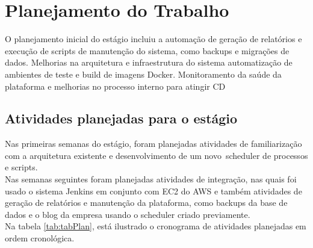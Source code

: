 \chapter{Planejamento do Trabalho}\label{chap:atividadesPlanejadas}

O planejamento inicial do estágio incluiu a automação de geração de relatórios e execução de scripts de manutenção do sistema, como backups e migrações de dados. Melhorias na arquitetura e infraestrutura do sistema automatização de ambientes de teste e build de imagens \gls{Docker}. Monitoramento da saúde da plataforma e melhorias no processo interno para atingir \gls{CD}


\section{Atividades planejadas para o estágio}



Nas primeiras semanas do estágio, foram planejadas atividades de familiarização com a arquitetura existente e desenvolvimento de um novo~\gls{scheduler} de processos e scripts.\\

Nas semanas seguintes foram planejadas atividades de integração, nas quais foi usado o sistema \gls{Jenkins} em conjunto com \gls{EC2} do \gls{AWS} e também atividades de geração de relatórios e manutenção da plataforma, como backups da base de dados e o blog da empresa usando o \gls{scheduler} criado previamente.\\

Na tabela \ref{tab:tabPlan}, está ilustrado o cronograma de atividades planejadas em ordem cronológica.\\

